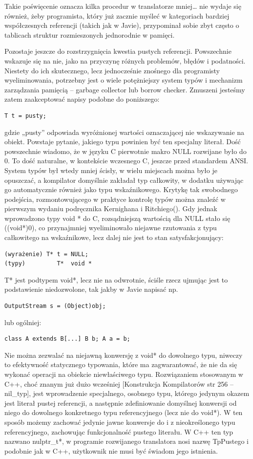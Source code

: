 Takie poświęcenie oznacza kilka procedur w translatorze mniej… nie wydaje się również, żeby programista, który już zacznie myśleć w kategoriach bardziej współczesnych referencji (takich jak w Javie), przypominał sobie zbyt często o tablicach struktur rozmieszonych jednorodnie w pamięci.

Pozostaje jeszcze do rozstrzygnięcia kwestia pustych referencji. Powszechnie wskazuje się na nie, jako na przyczynę różnych problemów, błędów i podatności. Niestety do ich skutecznego, lecz jednocześnie znośnego dla programisty wyeliminowania, potrzebny jest o wiele potężniejszy system typów i mechanizm zarządzania pamięcią – garbage collector lub borrow checker. Zmuszeni jesteśmy zatem zaakceptować napisy podobne do poniższego:
\begin{lstlisting}
T t = pusty;    
\end{lstlisting}
 gdzie „pusty” odpowiada wyróżnionej wartości oznaczającej nie wskazywanie na obiekt. Powstaje  pytanie, jakiego typu powinien być ten specjalny literał. Dość powszechnie wiadomo, że w języku C pierwotnie makro NULL rozwijane było do 0.\cite{KiR} To dość naturalne, w kontekście wczesnego C, jeszcze przed standardem ANSI. System typów był wtedy mniej ścisły, w wielu miejscach można było je opuszczać, a kompilator domyślnie zakładał typ całkowity, w dodatku używając go automatycznie również jako typu wskaźnikowego. Krytykę tak swobodnego podejścia, rozmontowującego w praktyce kontrolę typów można znaleźć w pierwszym wydaniu podręcznika Kernighana i Ritchiego(\cite{KiR}). Gdy jednak wprowadzono  typy void * do C, rozsądniejszą wartością dla NULL stało się ((void*)0), co przynajmniej wyeliminowało niejawne rzutowania z typu całkowitego na wskaźnikowe, lecz dalej nie jest to stan satysfakcjonujący:
\begin{lstlisting}
(wyrażenie) T* t = NULL;
(typy)         T*  void *
\end{lstlisting}
T* jest podtypem void*, lecz nie na odwrotnie, ściśle rzecz ujmując jest to podstawienie niedozwolone, tak jakby w Javie napisać np.
\begin{lstlisting}
OutputStream s = (Object)obj;
\end{lstlisting}
lub ogólniej:
\begin{lstlisting}
class A extends B[...] B b; A a = b;
\end{lstlisting}
Nie można zezwalać na niejawną konwersję z void* do dowolnego typu, niweczy to efektywność statycznego typowania, które ma zagwarantować, że nie da się wykonać operacji na obiekcie niewłaściwego typu. Rozwiązaniem stosowanym w C++, choć znanym już dużo wcześniej [Konstrukcja Kompilatorów str 256 – nil\_typ], jest wprowadzenie specjalnego, osobnego typu, którego jedynym okazem jest literał pustej referencji, a następnie zdefiniowanie domyślnej konwersji od niego do dowolnego konkretnego typu referencyjnego (lecz nie do void*). W ten sposób możemy zachować jedynie jawne konwersje do i z nieokreślonego typu referencyjnego,  zachowując funkcjonalność pustego literału. W C++ ten typ nazwano nulptr\_t*, w programie rozwijanego translatora nosi nazwę TpPustego i podobnie jak w C++, użytkownik nie musi być świadom jego istnienia.

